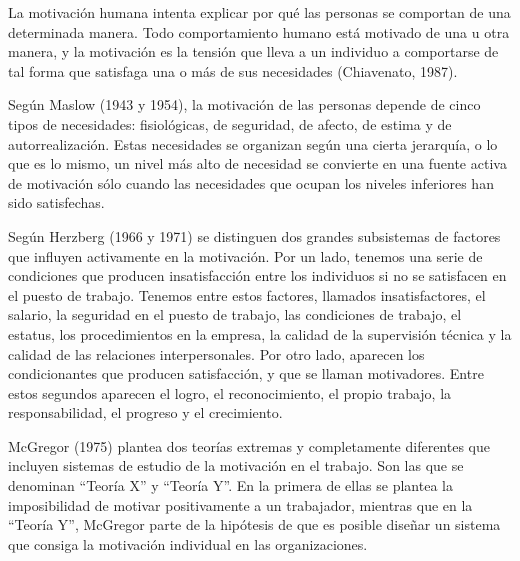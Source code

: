 \documentclass[
]{krantz}
\begin{document}
La motivación humana intenta explicar por qué las personas se comportan de una determinada manera. Todo comportamiento humano está motivado de una u otra manera, y la motivación es la tensión que lleva a un individuo a comportarse de tal forma que satisfaga una o más de sus necesidades (Chiavenato, 1987).

Según Maslow (1943 y 1954), la motivación de las personas depende de cinco tipos de necesidades: fisiológicas, de seguridad, de afecto, de estima y de autorrealización. Estas necesidades se organizan según una cierta jerarquía, o lo que es lo mismo, un nivel más alto de necesidad se convierte en una fuente activa de motivación sólo cuando las necesidades que ocupan los niveles inferiores han sido satisfechas.

Según Herzberg (1966 y 1971) se distinguen dos grandes subsistemas de factores que influyen activamente en la motivación. Por un lado, tenemos una serie de condiciones que producen insatisfacción entre los individuos si no se satisfacen en el puesto de trabajo. Tenemos entre estos factores, llamados insatisfactores, el salario, la seguridad en el puesto de trabajo, las condiciones de trabajo, el estatus, los procedimientos en la empresa, la calidad de la supervisión técnica y la calidad de las relaciones interpersonales. Por otro lado, aparecen los condicionantes que producen satisfacción, y que se llaman motivadores. Entre estos segundos aparecen el logro, el reconocimiento, el propio trabajo, la responsabilidad, el progreso y el crecimiento.

McGregor (1975) plantea dos teorías extremas y completamente diferentes que incluyen sistemas de estudio de la motivación en el trabajo. Son las que se denominan ``Teoría X'' y ``Teoría Y''. En la primera de ellas se plantea la imposibilidad de motivar positivamente a un trabajador, mientras que en la ``Teoría Y'', McGregor parte de la hipótesis de que es posible diseñar un sistema que consiga la motivación individual en las organizaciones.
\end{document}
